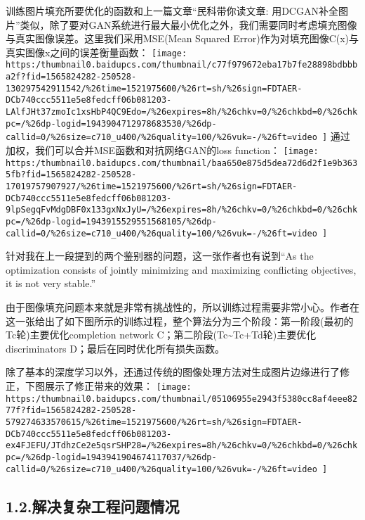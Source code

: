 \documentclass{article}
\begin{document}
训练图片填充所要优化的函数和上一篇文章“民科带你读文章: 用DCGAN补全图片”类似，除了要对GAN系统进行最大最小优化之外，我们需要同时考虑填充图像与真实图像误差。这里我们采用MSE(Mean Squared Error)作为对填充图像C(x)与真实图像x之间的误差衡量函数：
\texttt{[image: https:/thumbnail0.baidupcs.com/thumbnail/c77f979672eba17b7fe28898bdbbba2f?fid=1565824282-250528-130297542911542/\%26time=1521975600/\%26rt=sh/\%26sign=FDTAER-DCb740ccc5511e5e8fedcff06b081203-LAlfJHt37zmoIc1xsHbP4QC9Edo=/\%26expires=8h/\%26chkv=0/\%26chkbd=0/\%26chkpc=/\%26dp-logid=1943904712978683530/\%26dp-callid=0/\%26size=c710\_u400/\%26quality=100/\%26vuk=-/\%26ft=video
]}{}
通过加权，我们可以合并MSE函数和对抗网络GAN的loss function：
\texttt{[image: https:/thumbnail0.baidupcs.com/thumbnail/baa650e875d5dea72d6d2f1e9b3635fb?fid=1565824282-250528-17019757907927/\%26time=1521975600/\%26rt=sh/\%26sign=FDTAER-DCb740ccc5511e5e8fedcff06b081203-9lpSegqFvMdgDBF0x133gxNxJyU=/\%26expires=8h/\%26chkv=0/\%26chkbd=0/\%26chkpc=/\%26dp-logid=1943915529551568105/\%26dp-callid=0/\%26size=c710\_u400/\%26quality=100/\%26vuk=-/\%26ft=video
]}{}%

针对我在上一段提到的两个鉴别器的问题，这一张作者也有说到“As the optimization consists of jointly minimizing and maximizing conflicting objectives, it is not very stable.”%

由于图像填充问题本来就是非常有挑战性的，所以训练过程需要非常小心。作者在这一张给出了如下图所示的训练过程，整个算法分为三个阶段：第一阶段(最初的Tc轮)主要优化completion network C；第二阶段(Tc\textasciitilde{}Tc+Td轮)主要优化discriminators D；最后在同时优化所有损失函数。%

除了基本的深度学习以外，还通过传统的图像处理方法对生成图片边缘进行了修正，下图展示了修正带来的效果：
\texttt{[image: https:/thumbnail0.baidupcs.com/thumbnail/05106955e2943f5380cc8af4eee8277f?fid=1565824282-250528-579274633570615/\%26time=1521975600/\%26rt=sh/\%26sign=FDTAER-DCb740ccc5511e5e8fedcff06b081203-ex4FJEFU/JTdhzCe2e5qsrSHP28=/\%26expires=8h/\%26chkv=0/\%26chkbd=0/\%26chkpc=/\%26dp-logid=1943941904674117037/\%26dp-callid=0/\%26size=c710\_u400/\%26quality=100/\%26vuk=-/\%26ft=video
]}{}%

\subsection{1.2.\hspace*{0.5em}解决复杂工程问题情况}\label{section}%
\end{document}
